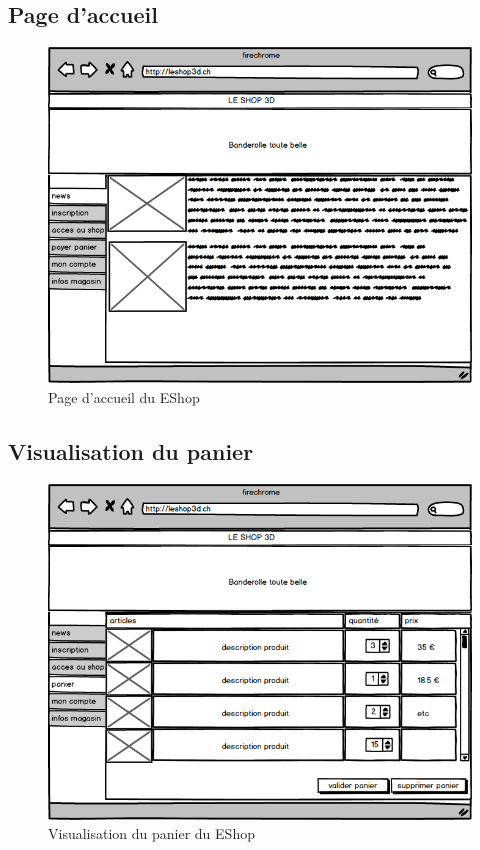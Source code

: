 \documentclass[12pt]{article}
\begin{document}
\subsection{Page d'accueil}

\begin{figure}[ht]
    \center
    \includegraphics[scale=0.6]{../Maquettes/page_accueil.jpeg}
    \caption*{Page d'accueil du EShop}
\end{figure}

\subsection{Visualisation du panier}

\begin{figure}[ht]
    \center
    \includegraphics[scale=0.6]{../Maquettes/visualisation_panier.jpeg}
    \caption*{Visualisation du panier du EShop}
\end{figure}
\end{document}
